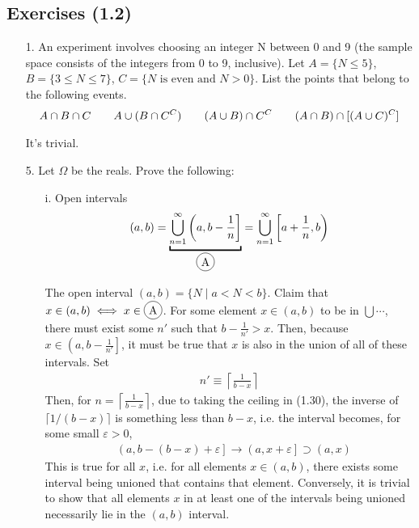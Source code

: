 \subsection{Exercises (1.2)}
\begin{enumerate}
    \item[1.] An experiment involves choosing an integer N between 0 and 9 (the sample space consists of the integers from 0 to 9, inclusive). Let $A = \{ N \le 5 \}$, $B = \{ 3 \le N \le 7 \}$, $C = \{ N \text{ is even and } N > 0 \} $. List the points that belong to the following events.
    \begin{align}
        A \cap B \cap C \qsp A \cup (B \cap C^C) \qsp (A \cup B) \cap C^C \qsp (A \cap B) \cap [(A \cup C)^C]
    \end{align}
    \begin{solution}
        It's trivial.
    \end{solution}
    \item[5.] Let $\Omega$ be the reals. Prove the following:
    \begin{itemize}
        \item[i.] Open intervals \begin{align}
            (a,b) = \underbracket{\bigcup_{n=1}^\infty \left( a, b - \frac{1}{n} \right]}_{\circled{A}} = \bigcup_{n=1}^\infty \left[ a + \frac{1}{n}, b \right)
        \end{align}
        \begin{solution}
            The open interval $(a,b) = \{ N \mid a < N < b \}$. Claim that $x \in (a,b) \iff x \in \circled{A}$. For some element $x \in (a,b)$ to be in $\bigcup \cdots$, there must exist some $n'$ such that $b - \frac{1}{n'} > x$. Then, because $x \in \left(a, b - \frac{1}{n'}\right]$, it must be true that $x$ is also in the union of all of these intervals. Set
            \begin{align}
                n' \equiv \left\lceil\frac{1}{b - x}\right\rceil
            \end{align}
            Then, for $n = \left\lceil\frac{1}{b - x}\right\rceil$, due to taking the ceiling in (1.30), the inverse of $\lceil1/(b-x)\rceil$ is something less than $b - x$, i.e. the interval becomes, for some small $\varepsilon > 0$,
            \begin{align}
                &\left(a, b - (b - x) + \varepsilon \right] \to \left( a, x + \varepsilon \right] \supset (a,x)
            \end{align}
            This is true for all $x$, i.e. for all elements $x \in (a,b)$, there exists some interval being unioned that contains that element. Conversely, it is trivial to show that all elements $x$ in at least one of the intervals being unioned necessarily lie in the $(a,b)$ interval.

\end{solution}
\end{itemize}
\end{enumerate}
